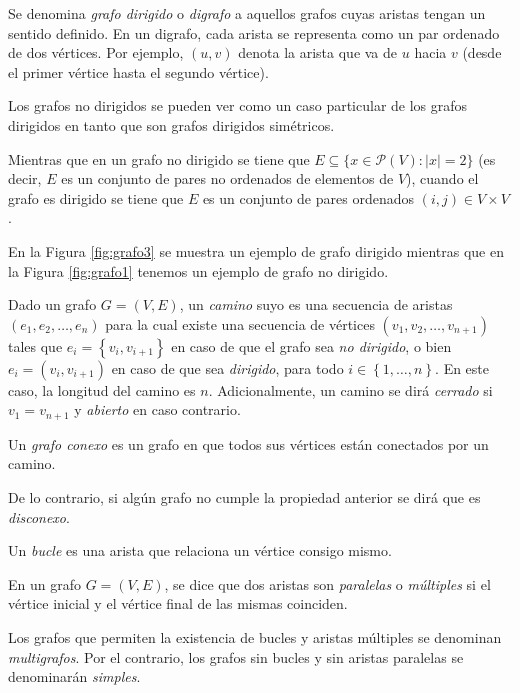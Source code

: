 \begin{definition}
Se denomina \emph{grafo dirigido} o \emph{digrafo} a aquellos grafos cuyas aristas tengan un sentido definido. En un digrafo, cada arista se representa como un par ordenado de dos vértices. Por ejemplo, $(u,v)$ denota la arista que va de $u$ hacia $v$ (desde el primer vértice hasta el segundo vértice).

Los grafos no dirigidos se pueden ver como un caso particular de los grafos dirigidos en tanto que son grafos dirigidos simétricos.

Mientras que en un grafo no dirigido se tiene que $E \subseteq \{x \in \mathcal{P}(V) : |x| = 2\}$ (es decir, $E$ es un conjunto de pares no ordenados de elementos de $V$), cuando el grafo es dirigido se tiene que $E$ es un conjunto de pares ordenados $(i,j) \in V \times V$.
\end{definition}

\begin{exampleth}
En la Figura \ref{fig:grafo3} se muestra un ejemplo de grafo dirigido mientras que en la Figura \ref{fig:grafo1} tenemos un ejemplo de grafo no dirigido.
\end{exampleth}

\begin{definition}\label{def:conexo}
Dado un grafo $G=(V,E)$, un \emph{camino} suyo es una secuencia de aristas $(e_1,e_2,\dots,e_n)$ para la cual existe una secuencia de vértices $(v_1,v_2,\dots,v_{n+1})$ tales que $e_i = \left\lbrace v_i,v_{i+1} \right\rbrace$ en caso de que el grafo sea \emph{no dirigido}, o bien $e_i = (v_i, v_{i+1})$ en caso de que sea \emph{dirigido}, para todo $i \in \left\lbrace 1,\dots,n \right\rbrace$. En este caso, la longitud del camino es $n$. Adicionalmente, un camino se dirá \emph{cerrado} si $v_1 = v_{n+1}$ y \emph{abierto} en caso contrario.

Un \emph{grafo conexo} es un grafo en que todos sus vértices están conectados por un camino.

De lo contrario, si algún grafo no cumple la propiedad anterior se dirá que es \emph{disconexo}.
\end{definition}

\begin{definition}
Un \emph{bucle} es una arista que relaciona un vértice consigo mismo.
\end{definition}

\begin{definition}
En un grafo $G=(V,E)$, se dice que dos aristas son \emph{paralelas} o \emph{múltiples} si el vértice inicial y el vértice final de las mismas coinciden. 

Los grafos que permiten la existencia de bucles y aristas múltiples se denominan \emph{multigrafos}. Por el contrario, los grafos sin bucles y sin aristas paralelas se denominarán \emph{simples}.
\end{definition}

